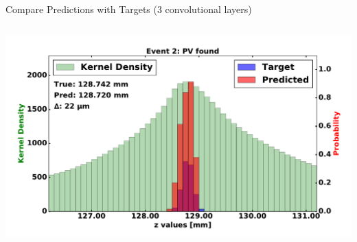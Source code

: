 \begin{frame}{Compare Predictions with Targets (3 convolutional layers)}
\begin{columns}[c]
\begin{center}
           \includegraphics[width=1\textwidth, height=0.45\textwidth, trim=18 0 18 0]{images/120000_3layer_15.pdf}
       \end{center}
  \end{columns}
\end{frame}







